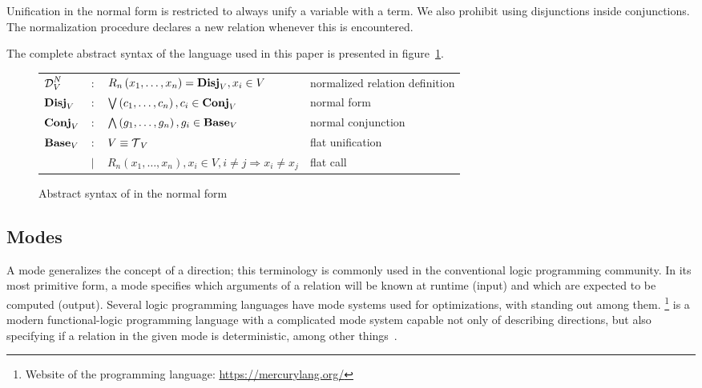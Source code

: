 Unification in the normal form is restricted to always unify a variable with a term.
We also prohibit using disjunctions inside conjunctions.
The normalization procedure declares a new relation whenever this is encountered.

The complete abstract syntax of the \micro language used in this paper is presented in figure~\ref{fig:miniKanren}.

\begin{figure}[h]
    \begin{tabular}{llll}
     $\operatorname{\mathcal{D}}_{V}^N$ & $:$ & $R_{n}\left( x_1, \ldots, x_{n} \right) = \operatorname{\mathbf{Disj}}_{V}, x_{i}\in V$ & normalized relation definition \\
    $\operatorname{\mathbf{Disj}}_{V}$ & $:$ & $\bigvee\left( c_1, \ldots, c_{n} \right), c_{i}\in \operatorname{\mathbf{Conj}}_{V}$ & normal form \\
    $\operatorname{\mathbf{Conj}}_{V}$ & $:$ & $\bigwedge\left( g_1, \ldots, g_n \right), g_{i}\in \operatorname{\mathbf{Base}}_{V}$ & normal conjunction \\
    $\operatorname{\mathbf{Base}}_{V}$ & $:$ & $V \equiv \operatorname{\mathcal{T}}_{V}$ & flat unification \\
                & $\mid$ & $R_{n}\left( x_1, \ldots, x_{n} \right), x_{i}\in V, i \neq j \Rightarrow x_i \neq x_j$ & flat call\\

    \end{tabular}
    \caption{Abstract syntax of \micro in the normal form}
    \label{fig:miniKanren}
\end{figure}

\subsection{Modes}

A mode generalizes the concept of a direction; this terminology is commonly used in the conventional logic programming community.
In its most primitive form, a mode specifies which arguments of a relation will be known at runtime (input) and which are expected to be computed (output).
Several logic programming languages have mode systems used for optimizations, with \merc standing out among them.
\merc\footnote{Website of the \merc programming language: \url{https://mercurylang.org/}} is a modern functional-logic programming language with a complicated mode system capable not only of describing directions, but also specifying if a relation in the given mode is deterministic, among other things~\cite{overton2002constraint}.

